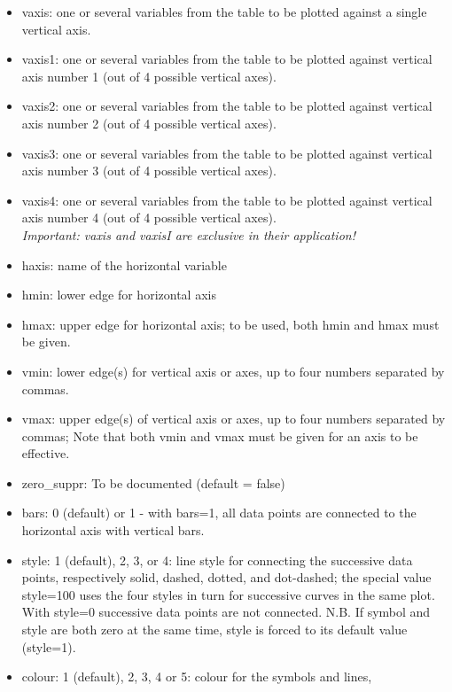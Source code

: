 \begin{itemize}
   \item vaxis: one or several variables from the table to be plotted
     against a single vertical axis.   
   \item vaxis1: one or several variables from the table to be plotted
     against vertical axis number 1 (out of 4 possible vertical axes).  
   \item vaxis2: one or several variables from the table to be plotted
     against vertical axis number 2 (out of 4 possible vertical axes).  
   \item vaxis3: one or several variables from the table to be plotted
     against vertical axis number 3 (out of 4 possible vertical axes).  
   \item vaxis4: one or several variables from the table to be plotted
     against vertical axis number 4 (out of 4 possible vertical axes). \\ 
   \textit{Important: vaxis and vaxisI are exclusive in their
     application!} 
   \item haxis: name of the horizontal variable 
   \item hmin: lower edge for horizontal axis 
   \item hmax: upper edge for horizontal axis; to be used, both hmin and hmax
     must be given.   
   \item vmin: lower edge(s) for vertical axis or axes, up to four
     numbers separated by commas.
   \item vmax: upper edge(s) of vertical axis or axes, up to four
     numbers separated by commas; 
     Note that both vmin and vmax must be given for an axis to be effective.   
   \item zero\_suppr: To be documented (default = false)
   \item bars: 0 (default) or 1 - with bars=1, all data points
     are connected to the horizontal axis with vertical bars.   
   \item style: 1 (default), 2, 3, or 4: line style for connecting the
     successive data points, respectively solid, dashed, dotted, and dot-dashed; 
     the special value style=100 uses the four styles in turn for
     successive curves in the same plot. 
     With style=0 successive data points are not connected. 
     N.B. If symbol and style are both zero at the same time, style is
     forced to its default value (style=1).
   \item colour: 1 (default), 2, 3, 4 or 5: colour for the symbols and lines, 

\end{itemize}
